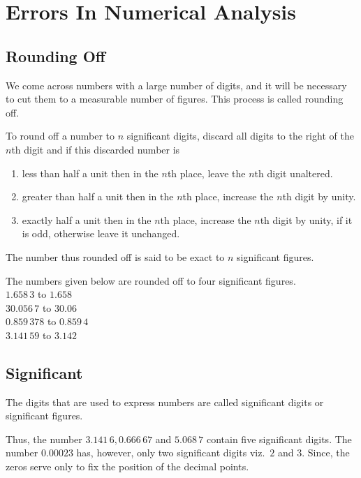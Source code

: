 \documentclass[12pt,class=book,crop=false]{standalone}
\begin{document}
\chapter{Errors In Numerical Analysis}
\section{Rounding Off}
We come across numbers with a large number of digits, and it will be necessary to cut them to a measurable number of figures. This process is called rounding off.

To round off a number to \( n \) significant digits, discard all digits to the right of the \( n \)th digit and if this discarded number is
\begin{enumerate}[label=(\alph*)]
    \item less than half a unit then in the \( n \)th place, leave the \( n \)th digit unaltered.
    \item greater than half a unit then in the \( n \)th place, increase the \( n \)th digit by unity.
    \item exactly half a unit then in the \( n \)th place, increase the \( n \)th digit by unity, if it is odd, otherwise leave it unchanged.
\end{enumerate}
The number thus rounded off is said to be exact to \( n \) significant figures.
\begin{ex}
    The numbers given below are rounded off to four significant figures.\\
    \indent \( 1.658\,3 \) to \( 1.658 \)\\
    \indent \( 30.056\,7 \) to \( 30.06 \)\\
    \indent \( 0.859\,378 \) to \( 0.859\,4 \)\\
    \indent \( 3.141\,59 \) to \( 3.142 \)
\end{ex}
\section{Significant}
The digits that are used to express numbers are called significant digits or significant figures.

Thus, the number \( 3.141\,6, 0.666\,67 \) and \( 5.068\,7 \) contain five significant digits. The number \( 0.00023 \) has, however, only two significant digits viz.\ \( 2 \) and \( 3 \). Since, the zeros serve only to fix the position of the decimal points.
\end{document}
